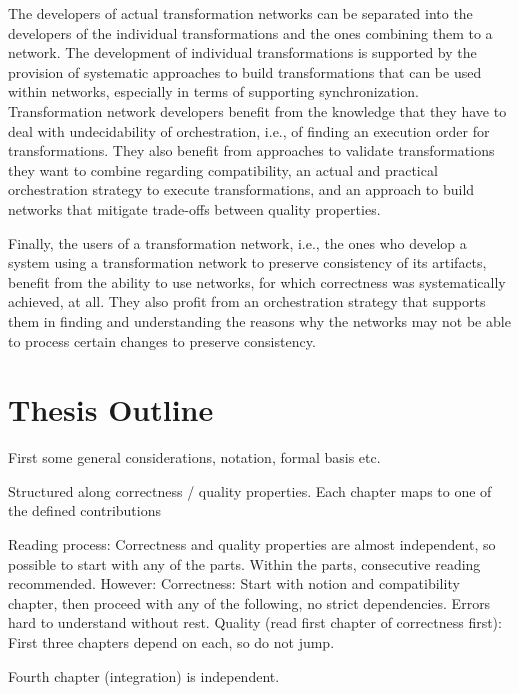 The developers of actual transformation networks can be separated into the developers of the individual transformations and the ones combining them to a network.
The development of individual transformations is supported by the provision of systematic approaches to build transformations that can be used within networks, especially in terms of supporting synchronization.
Transformation network developers benefit from the knowledge that they have to deal with undecidability of orchestration, i.e., of finding an execution order for transformations.
They also benefit from approaches to validate transformations they want to combine regarding compatibility, an actual and practical orchestration strategy to execute transformations, and an approach to build networks that mitigate trade-offs between quality properties.

Finally, the users of a transformation network, i.e., the ones who develop a system using a transformation network to preserve consistency of its artifacts, benefit from the ability to use networks, for which correctness was systematically achieved, at all.
They also profit from an orchestration strategy that supports them in finding and understanding the reasons why the networks may not be able to process certain changes to preserve consistency.



\section{Thesis Outline}


First some general considerations, notation, formal basis etc.

Structured along correctness / quality properties.
Each chapter maps to one of the defined contributions

Reading process: Correctness and quality properties are almost independent, so possible to start with any of the parts. Within the parts, consecutive reading recommended.
However:
Correctness: Start with notion and compatibility chapter, then proceed with any of the following, no strict dependencies. Errors hard to understand without rest.
Quality (read first chapter of correctness first): First three chapters depend on each, so do not jump. 
\begin{integrationcontribution}
    Fourth chapter (integration) is independent.
\end{integrationcontribution}

